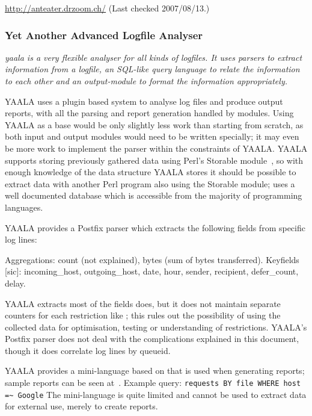 \documentclass[a4paper,12pt,draft]{article}
\newcommand{\parsername}{\PLP{}}
\newcommand{\tab}[0]{%
    \hspace*{2em}%
}
\begin{document}
\url{http://anteater.drzoom.ch/} \newline (Last checked 2007/08/13.)

\subsubsection{Yet Another Advanced Logfile Analyser}

\textit{yaala is a very flexible analyser for all kinds of logfiles. It
uses parsers to extract information from a logfile, an SQL-like query
language to relate the information to each other and an output-module to
format the information appropriately.\/}

YAALA uses a plugin based system to analyse log files and produce \HTML{}
output reports, with all the parsing and report generation handled by
modules.  Using YAALA as a base would be only slightly less work than
starting from scratch, as both input and output modules would need to be
written specially; it may even be more work to implement the parser within
the constraints of YAALA\@.  YAALA supports storing previously gathered
data using Perl's Storable module~\cite{perl-storable}, so with enough
knowledge of the data structure YAALA stores it should be possible to
extract data with another Perl program also using the Storable module;
\parsername{} uses a well documented database which is accessible from the
majority of programming languages.

YAALA provides a Postfix parser which extracts the following fields from
specific log lines:

\noindent\tab{}Aggregations: count (not explained), bytes (sum of bytes
transferred).\newline \tab{}Keyfields [sic]: incoming\_host,
outgoing\_host, date, hour, sender, recipient, defer\_count, delay.

YAALA extracts most of the fields \parsername{} does, but it does not
maintain separate counters for each restriction like \parsername{}; this
rules out the possibility of using the collected data for  optimisation,
testing or understanding of restrictions.  YAALA's Postfix parser does not
deal with the complications explained in this document, though it does
correlate log lines by queueid.

YAALA provides a mini-language based on \SQL{} that is used when generating
reports; sample reports can be seen at~\cite{yaala-samples}.  Example
query: \newline \tab{} \texttt{requests BY file WHERE host =\~{} Google}
\newline The mini-language is quite limited and cannot be used to extract
data for external use, merely to create reports.
\end{document}
